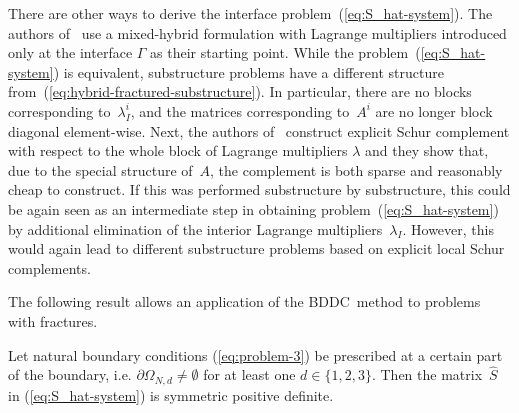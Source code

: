 \begin{remark}
There are other ways to derive the interface problem~(\ref{eq:S_hat-system}).
The authors of~\cite{Tu-2007-BAF,Cowsar-1995-BDD} use a mixed-hybrid
formulation with Lagrange multipliers introduced only at the interface
$\Gamma$ as their starting point. While the problem~(\ref{eq:S_hat-system}) is
equivalent, substructure problems have a different structure
from~(\ref{eq:hybrid-fractured-substructure}). In particular, there are no
blocks corresponding to~$\lambda_{I}^{i}$, and the matrices corresponding
to~$A^{i}$ are no longer block diagonal element-wise. Next, the authors
of~\cite{Maryska-2000-SCS,Brezina-2010-MHF} construct explicit Schur
complement with respect to the whole block of Lagrange multipliers $\lambda$
and they show that, due to the special structure of~$A$, the complement is
both sparse and reasonably cheap to construct. If this was performed
substructure by substructure, this could be again seen as an intermediate step
in obtaining problem~(\ref{eq:S_hat-system}) by additional elimination of the
interior Lagrange multipliers~$\lambda_{I}$. However, this would again lead to
different substructure problems based on explicit local Schur complements.
\end{remark}

The following result allows an application of the BDDC\ method to problems
with fractures.

\begin{theorem}
\label{th:sspd} Let natural boundary conditions (\ref{eq:problem-3}) be
prescribed at a certain part of the boundary, i.e. $\partial\Omega_{N,d}
\neq\emptyset$ for at least one $d\in\{1,2,3\}$. Then the matrix~$\widehat{S}$
in (\ref{eq:S_hat-system}) is symmetric positive definite.
\end{theorem}

